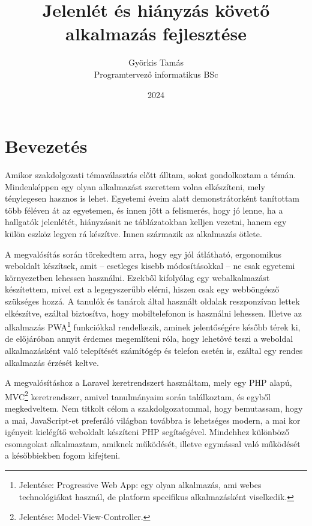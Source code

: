 \documentclass[
]{thesis-ekf}
\theoremstyle{definition}
\theoremstyle{remark}
\begin{document}
\title{Jelenlét és hiányzás követő alkalmazás fejlesztése}
\author{Györkis Tamás\\Programtervező informatikus BSc}
\date{2024}
\maketitle
\tableofcontents

\chapter*{Bevezetés}
Amikor szakdolgozati témaválasztás előtt álltam, sokat gondolkoztam a témán. Mindenképpen egy olyan alkalmazást szerettem volna elkészíteni, mely ténylegesen hasznos is lehet. Egyetemi éveim alatt demonstrátorként tanítottam több féléven át az egyetemen, és innen jött a felismerés, hogy jó lenne, ha a hallgatók jelenlétét, hiányzásait ne táblázatokban kelljen vezetni, hanem egy külön eszköz legyen rá készítve. Innen származik az alkalmazás ötlete.

A megvalósítás során törekedtem arra, hogy egy jól átlátható, ergonomikus weboldalt készítsek, amit -- esetleges kisebb módosításokkal -- ne csak egyetemi környezetben lehessen használni. Ezekből kifolyólag egy webalkalmazást készítettem, mivel ezt a legegyszerűbb elérni, hiszen csak egy webböngésző szükséges hozzá. A tanulók és tanárok által használt oldalak reszponzívan lettek elkészítve, ezáltal biztosítva, hogy mobiltelefonon is használni lehessen. Illetve az alkalmazás PWA\footnote{Jelentése: Progressive Web App: egy olyan alkalmazás, ami webes technológiákat használ, de platform specifikus alkalmazásként viselkedik.\cite{PWA}}  funkciókkal rendelkezik, aminek jelentőségére később térek ki, de előjáróban annyit érdemes megemlíteni róla, hogy lehetővé teszi a weboldal alkalmazásként való telepítését számítógép és telefon esetén is, ezáltal egy rendes alkalmazás érzését keltve.

A megvalósításhoz a Laravel\cite{meetlaravel} keretrendszert használtam, mely egy PHP\cite{php} alapú, MVC\footnote{Jelentése: Model-View-Controller.\cite{mvc}} keretrendszer, amivel tanulmányaim során találkoztam, és egyből megkedveltem. Nem titkolt célom a szakdolgozatommal, hogy bemutassam, hogy a mai, JavaScript-et\cite{javascript} preferáló világban továbbra is lehetséges modern, a mai kor igényeit kielégítő weboldalt készíteni PHP segítségével. Mindehhez különböző csomagokat alkalmaztam, amiknek működését, illetve egymással való működését a későbbiekben fogom kifejteni.
\end{document}
